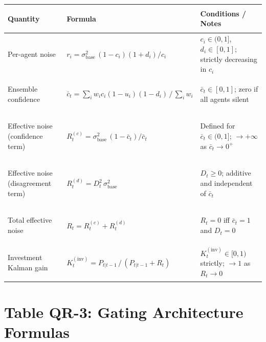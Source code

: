 \documentclass[12pt,openany]{book}
\numberwithin{equation}{chapter}
\theoremstyle{plain}
\theoremstyle{definition}
\theoremstyle{remark}
\renewcommand{\arraystretch}{1.2}
\begin{document}
\begin{center}
\small
\renewcommand{\arraystretch}{1.40}
\begin{tabularx}{\linewidth}{@{}
  >{\bfseries\raggedright\arraybackslash}p{3.2cm}
  >{\raggedright\arraybackslash}p{4.6cm}
  >{\raggedright\arraybackslash}X
@{}}
\toprule
Quantity & Formula & Conditions / Notes \\
\midrule
Per-agent noise &
$r_i = \sigma_{\mathrm{base}}^2\,(1-c_i)(1+d_i)/c_i$ &
$c_i\in(0,1]$, $d_i\in[0,1]$; strictly decreasing in $c_i$ \\
Ensemble confidence &
$\bar{c}_t = \sum_i w_i c_i(1-u_i)(1-d_i)\,/\,\sum_i w_i$ &
$\bar{c}_t\in[0,1]$; zero if all agents silent \\
Effective noise (confidence term) &
$R_t^{(c)} = \sigma_{\mathrm{base}}^2\,(1-\bar{c}_t)/\bar{c}_t$ &
Defined for $\bar{c}_t\in(0,1]$; $\to+\infty$ as $\bar{c}_t\to 0^+$ \\
Effective noise (disagreement term) &
$R_t^{(d)} = D_t^2\,\sigma_{\mathrm{base}}^2$ &
$D_t\geq 0$; additive and independent of $\bar{c}_t$ \\
Total effective noise &
$R_t = R_t^{(c)} + R_t^{(d)}$ &
$R_t=0$ iff $\bar{c}_t=1$ and $D_t=0$ \\
Investment Kalman gain &
$K_t^{(\mathrm{inv})} = P_{t|t-1}\,/\,(P_{t|t-1}+R_t)$ &
$K_t^{(\mathrm{inv})}\in[0,1)$ strictly; $\to 1$ as $R_t\to 0$ \\
\bottomrule
\end{tabularx}
\end{center}

\section*{Table QR-3: Gating Architecture Formulas}
\end{document}
